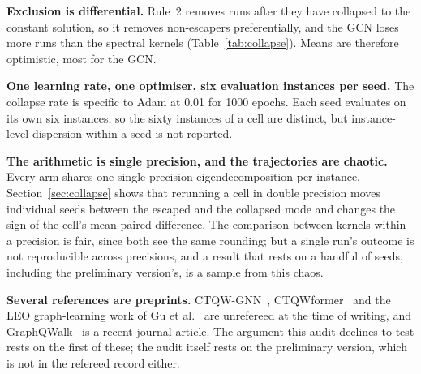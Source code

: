 \documentclass[preprint,11pt,3p]{elsarticle}
\begin{document}
\textbf{Exclusion is differential.} Rule~2 removes runs after they have collapsed to the constant
solution, so it removes non-escapers preferentially, and the GCN loses more runs than the spectral
kernels (Table~\ref{tab:collapse}). Means are therefore optimistic, most for the GCN.

\textbf{One learning rate, one optimiser, six evaluation instances per seed.} The collapse rate is
specific to Adam at 0.01 for 1000 epochs. Each seed evaluates on its own six instances, so the
sixty instances of a cell are distinct, but instance-level dispersion within a seed is not
reported.

\textbf{The arithmetic is single precision, and the trajectories are chaotic.} Every arm
shares one single-precision eigendecomposition per instance. Section~\ref{sec:collapse} shows
that rerunning a cell in double precision moves individual seeds between the escaped and the
collapsed mode and changes the sign of the cell's mean paired difference. The comparison between
kernels within a precision is fair, since both see the same rounding; but a single run's outcome
is not reproducible across precisions, and a result that rests on a handful of seeds, including
the preliminary version's, is a sample from this chaos. 

\textbf{Several references are preprints.} CTQW-GNN~\cite{ctqwgnn}, CTQWformer~\cite{ctqwformer}
and the LEO graph-learning work of Gu et al.~\cite{deepladu} are unrefereed at the time of
writing, and GraphQWalk~\cite{graphqwalk} is a recent journal article. The argument this audit
declines to test rests on the first of these; the audit itself rests on the preliminary version,
which is not in the refereed record either.
\end{document}

